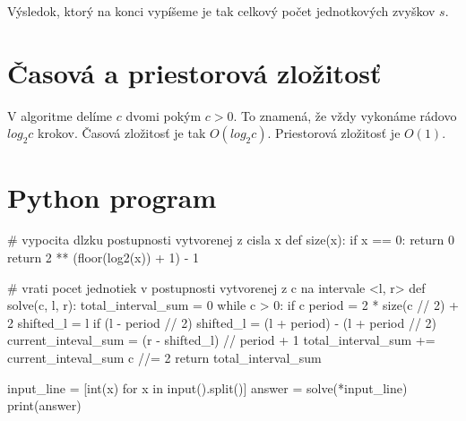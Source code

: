 \documentclass[10pt]{article}
\begin{document}
Výsledok, ktorý na konci vypíšeme je tak celkový počet jednotkových zvyškov
$s$.

\section*{Časová a priestorová zložitosť}

V algoritme delíme $c$ dvomi pokým $c > 0$. To znamená, že vždy vykonáme
rádovo $log_2 c$ krokov. Časová zložitosť je tak $O(log_2 c)$. Priestorová
zložitosť je $O(1)$. 

\section*{Python program}

\begin{python}
  
# vypocita dlzku postupnosti vytvorenej z cisla x
def size(x):
    if x == 0:
        return 0
    return 2 ** (floor(log2(x)) + 1) - 1

# vrati pocet jednotiek v postupnosti vytvorenej z c na intervale <l, r>
def solve(c, l, r):
    total_interval_sum = 0
    while c > 0:
        if c %
            period = 2 * size(c // 2) + 2
            shifted_l = l
            if (l - period // 2) %
                shifted_l = (l + period) - (l + period // 2) %
            current_inteval_sum = (r - shifted_l) // period + 1
            total_interval_sum += current_inteval_sum
        c //= 2
    return total_interval_sum

input_line = [int(x) for x in input().split()]
answer = solve(*input_line)
print(answer)

\end{python}
\end{document}
